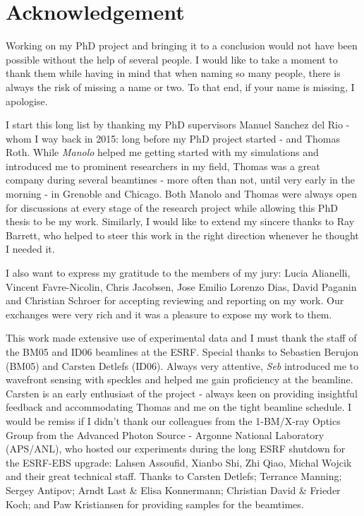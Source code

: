 
\chapter*{Acknowledgement}
\label{sec:acknowledgement}
\vspace*{-10mm}

Working on my PhD project and bringing it to a conclusion would not have been possible without the help of several people. I would like to take a moment to thank them while having in mind that when naming so many people, there is always the risk of missing a name or two. To that end, if your name is missing, I apologise.

I start this long list by thanking my PhD supervisors Manuel Sanchez del Rio - whom I way back in 2015: long before my PhD project started - and Thomas Roth. While \textit{Manolo} helped me getting started with my simulations and introduced me to prominent researchers in my field, Thomas was a great company during several beamtimes - more often than not, until very early in the morning - in Grenoble and Chicago. Both Manolo and Thomas were always open for discussions at every stage of the research project while allowing this PhD thesis to be my work. Similarly, I would like to extend my sincere thanks to Ray Barrett, who helped to steer this work in the right direction whenever he thought I needed it.

I also want to express my gratitude to the members of my jury: Lucia Alianelli, Vincent Favre-Nicolin, Chris Jacobsen, Jose Emilio Lorenzo Dias, David Paganin and Christian Schroer for accepting reviewing and reporting on my work. Our exchanges were very rich and it was a pleasure to expose my work to them.

This work made extensive use of experimental data and I must thank the staff of the BM05 and ID06 beamlines at the ESRF. Special thanks to Sebastien Berujon (BM05) and Carsten Detlefs (ID06). Always very attentive, \textit{Seb} introduced me to wavefront sensing with speckles and helped me gain proficiency at the beamline. Carsten is an early enthusiast of the project - always keen on providing insightful feedback and accommodating Thomas and me on the tight beamline schedule. I would be remiss if I didn’t thank our colleagues from the 1-BM/X-ray Optics Group from the Advanced Photon Source - Argonne National Laboratory (APS/ANL), who hosted our experiments during the long ESRF shutdown for the ESRF-EBS upgrade: Lahsen Assoufid, Xianbo Shi, Zhi Qiao, Michal Wojcik and their great technical staff. Thanks to Carsten Detlefs; Terrance Manning; Sergey Antipov; Arndt Last \& Elisa Konnermann; Christian David \& Frieder Koch;  and Paw Kristiansen for providing samples for the beamtimes.

